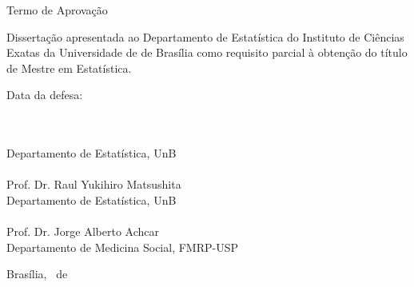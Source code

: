 \newpage
\begin{center}
\normalfont
{\sc Termo de Aprovação}

\vspace{1.5cm}
\autor

\vspace{2cm}
\doublespacing
{\sc \Large \titulo}

\justify

\vspace{1.5cm}
{\small Dissertação apresentada ao Departamento de Estatística
do Instituto de Ciências Exatas da Universidade de de Brasília como requisito
parcial à obtenção do título de Mestre em Estatística.}

\centering

\vspace{1.5cm}
Data da defesa: 

\vspace{1cm}

\begin{flushright}
{\underline{\qquad\qquad\qquad\qquad\qquad\qquad\qquad\qquad\qquad\qquad} }
\\
\orientador\\
Departamento de Estatística, UnB\\
\underline{\qquad\qquad\qquad\qquad\qquad\qquad\qquad\qquad\qquad\qquad} 
\\
Prof. Dr. Raul Yukihiro Matsushita\\
Departamento de Estatística, UnB\\
\vspace{0.7cm}
\underline{\qquad\qquad\qquad\qquad\qquad\qquad\qquad\qquad\qquad\qquad} 
\\
Prof. Dr. Jorge Alberto Achcar\\
Departamento de Medicina Social, FMRP-USP\\
\end{flushright}

Brasília, \mes\ de \ano
\end{center}
